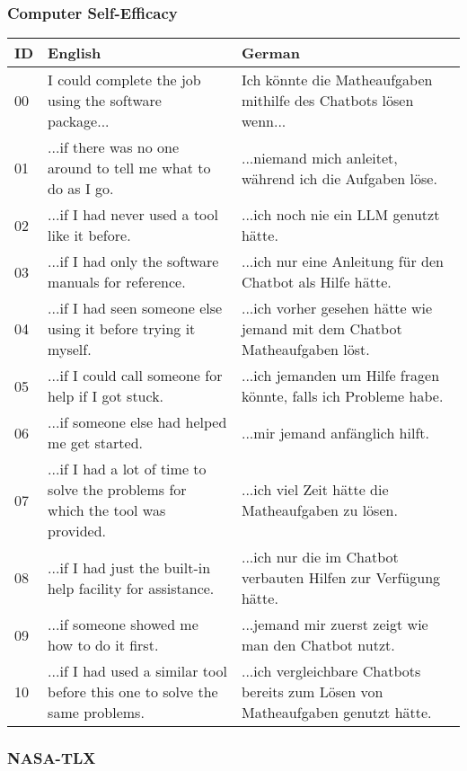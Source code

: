 \clearpage
\subsubsection*{Computer Self-Efficacy}

\begin{ctable}
    \begin{tabularx}{\textwidth}{l|X|X}
        \textbf{ID} & \textbf{English} & \textbf{German} \\
        \hline
        00 & I could complete the job using the software package... & Ich könnte die Matheaufgaben mithilfe des Chatbots lösen wenn... \\
        \hline
        01 & ...if there was no one around to tell me what to do as I go. & ...niemand mich anleitet, während ich die Aufgaben löse. \\
        02 & ...if I had never used a tool like it before. & ...ich noch nie ein LLM genutzt hätte. \\
        03 & ...if I had only the software manuals for reference. & ...ich nur eine Anleitung für den Chatbot als Hilfe hätte. \\
        04 & ...if I had seen someone else using it before trying it myself. & ...ich vorher gesehen hätte wie jemand mit dem Chatbot Matheaufgaben löst. \\
        05 & ...if I could call someone for help if I got stuck. & ...ich jemanden um Hilfe fragen könnte, falls ich Probleme habe. \\
        06 & ...if someone else had helped me get started. & ...mir jemand anfänglich hilft. \\
        07 & ...if I had a lot of time to solve the problems for which the tool was provided. & ...ich viel Zeit hätte die Matheaufgaben zu lösen. \\
        08 & ...if I had just the built-in help facility for assistance. & ...ich nur die im Chatbot verbauten Hilfen zur Verfügung hätte. \\
        09 & ...if someone showed me how to do it first. & ...jemand mir zuerst zeigt wie man den Chatbot nutzt. \\
        10 & ...if I had used a similar tool before this one to solve the same problems. & ...ich vergleichbare Chatbots bereits zum Lösen von Matheaufgaben genutzt hätte. \\
    \end{tabularx}
\end{ctable}

\clearpage
\subsubsection*{NASA-TLX}

